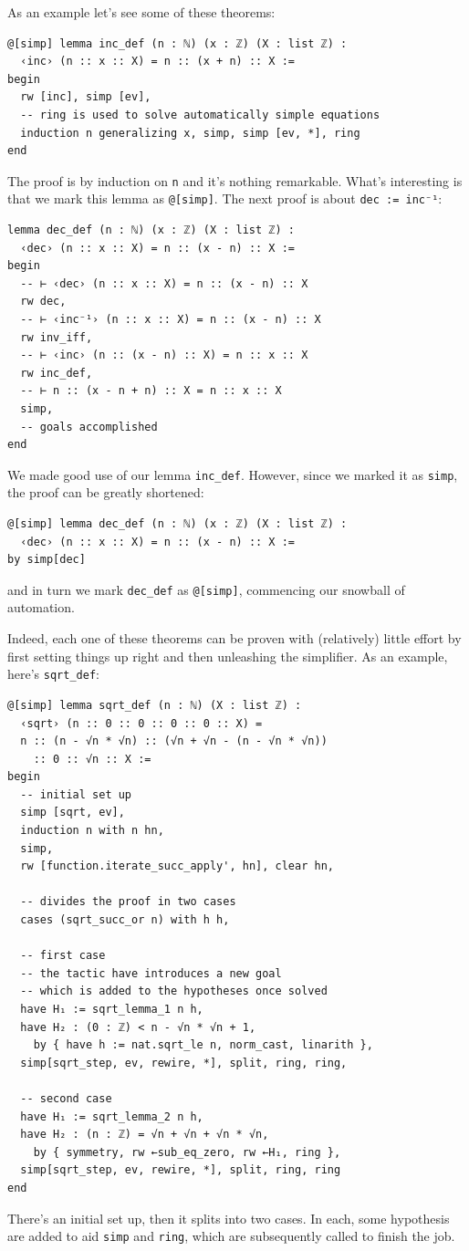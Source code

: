 \documentclass{book}
\theoremstyle{definition}
\theoremstyle{remark}
\theoremstyle{plain}
\begin{document}
As an example let's see some of these theorems:
\begin{lstlisting}
@[simp] lemma inc_def (n : ℕ) (x : ℤ) (X : list ℤ) :
  ‹inc› (n :: x :: X) = n :: (x + n) :: X :=
begin
  rw [inc], simp [ev],
  -- ring is used to solve automatically simple equations 
  induction n generalizing x, simp, simp [ev, *], ring
end
\end{lstlisting}
The proof is by induction on \lstinline{n} and it's nothing remarkable.
What's interesting is that we mark this lemma as \lstinline{@[simp]}.
The next proof is about \lstinline{dec := inc⁻¹}:
\begin{lstlisting}
lemma dec_def (n : ℕ) (x : ℤ) (X : list ℤ) :
  ‹dec› (n :: x :: X) = n :: (x - n) :: X :=
begin
  -- ⊢ ‹dec› (n :: x :: X) = n :: (x - n) :: X
  rw dec,
  -- ⊢ ‹inc⁻¹› (n :: x :: X) = n :: (x - n) :: X
  rw inv_iff,
  -- ⊢ ‹inc› (n :: (x - n) :: X) = n :: x :: X
  rw inc_def,
  -- ⊢ n :: (x - n + n) :: X = n :: x :: X
  simp,
  -- goals accomplished
end
\end{lstlisting}
We made good use of our lemma \lstinline{inc_def}.
However, since we marked it as \lstinline{simp}, the proof can be greatly shortened:
\begin{lstlisting}
@[simp] lemma dec_def (n : ℕ) (x : ℤ) (X : list ℤ) :
  ‹dec› (n :: x :: X) = n :: (x - n) :: X :=
by simp[dec]
\end{lstlisting}
and in turn we mark \lstinline{dec_def} as \lstinline{@[simp]},
commencing our snowball of automation.

Indeed, each one of these theorems can be proven with (relatively) little effort
by first setting things up right and then unleashing the simplifier.
As an example, here's \lstinline{sqrt_def}:
\begin{lstlisting}
@[simp] lemma sqrt_def (n : ℕ) (X : list ℤ) :
  ‹sqrt› (n :: 0 :: 0 :: 0 :: 0 :: X) =
  n :: (n - √n * √n) :: (√n + √n - (n - √n * √n))
    :: 0 :: √n :: X :=
begin
  -- initial set up
  simp [sqrt, ev],
  induction n with n hn,
  simp,
  rw [function.iterate_succ_apply', hn], clear hn,

  -- divides the proof in two cases
  cases (sqrt_succ_or n) with h h,

  -- first case
  -- the tactic have introduces a new goal
  -- which is added to the hypotheses once solved
  have H₁ := sqrt_lemma_1 n h,
  have H₂ : (0 : ℤ) < n - √n * √n + 1,
    by { have h := nat.sqrt_le n, norm_cast, linarith },
  simp[sqrt_step, ev, rewire, *], split, ring, ring,

  -- second case
  have H₁ := sqrt_lemma_2 n h,
  have H₂ : (n : ℤ) = √n + √n + √n * √n,
    by { symmetry, rw ←sub_eq_zero, rw ←H₁, ring },
  simp[sqrt_step, ev, rewire, *], split, ring, ring
end
\end{lstlisting}
There's an initial set up, then it splits into two cases.
In each, some hypothesis are added to aid \lstinline{simp} and \lstinline{ring},
which are subsequently called to finish the job.
\end{document}
